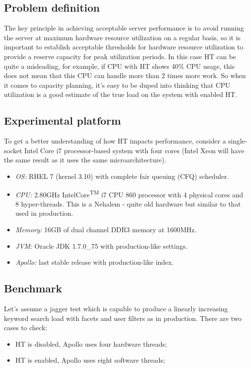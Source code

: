 \documentclass[12pt]{article}
\begin{document}
\subsection{Problem definition}

The key principle in achieving acceptable server performance is to avoid running the server at maximum hardware resource utilization on a regular basis, so it is important to establish acceptable thresholds for hardware resource utilization to provide a reserve capacity for peak utilization periods. In this case HT can be quite a misleading, for example, if CPU with HT shows 40\% CPU usage, this does not mean that this CPU can handle more than 2 times more work. So when it comes to capacity planning, it's easy to be duped into thinking that CPU utilization is a good estimate of the true load on the system with enabled HT. 

\subsection{Experimental platform}

To get a better understanding of how HT impacts performance, consider a single-socket Intel Core i7 processor-based system with four cores (Intel Xeon will have the same result as it uses the same microarchitecture).

\begin{itemize}
	\item {\em OS:} RHEL 7 (kernel 3.10) with complete fair queuing (CFQ) scheduler. 
	\item {\em CPU:} 2.80GHz Intel\circledR Core\textsuperscript{TM} i7 CPU 860 processor with 4 physical cores and 8 hyper-threads. This is a Nehalem - quite old hardware but similar to that used in production.
	\item {\em Memory:} 16GB of dual channel DDR3 memory at 1600MHz.
	\item {\em JVM:} Oracle JDK 1.7.0\_75 with production-like settings.
	\item {\em Apollo:} last stable release with production-like index.
\end{itemize}

\subsection{Benchmark}

Let's assume a jagger\cite{jagger} test which is capable to produce a linearly increasing keyword search load with facets and user filters as in production. There are two cases to check:
\begin{itemize}
	\item HT is disabled, Apollo uses four hardware threads;
	\item HT is enabled, Apollo uses eight software threads;
\end{itemize} 
\end{document}
